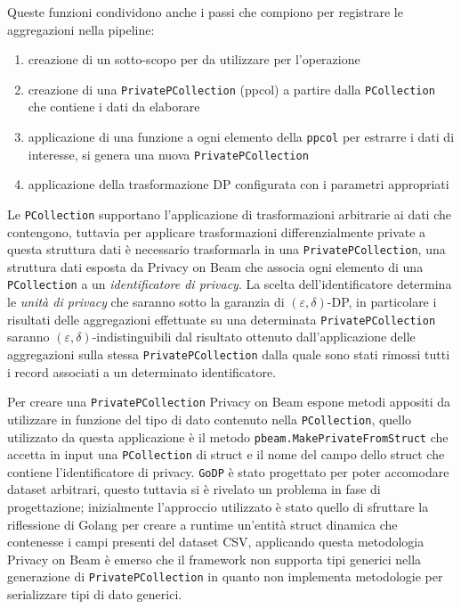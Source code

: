 Queste funzioni condividono anche i passi che compiono per registrare le aggregazioni nella pipeline:
\begin{enumerate}
    \item creazione di un sotto-scopo per da utilizzare per l'operazione
    \item creazione di una \texttt{PrivatePCollection} (ppcol) a partire dalla \texttt{PCollection} che contiene i dati da elaborare
    \item applicazione di una funzione a ogni elemento della \texttt{ppcol} per estrarre i dati di interesse, si genera una nuova \texttt{PrivatePCollection}
    \item applicazione della trasformazione DP configurata con i parametri appropriati
\end{enumerate}

Le \texttt{PCollection} supportano l'applicazione di trasformazioni arbitrarie ai dati che contengono, tuttavia per applicare trasformazioni differenzialmente private a questa struttura dati è necessario trasformarla in una \texttt{PrivatePCollection}, una struttura dati esposta da Privacy on Beam che associa ogni elemento di una \texttt{PCollection} a un \textit{identificatore di privacy}. La scelta dell'identificatore determina le \textit{unità di privacy} che saranno sotto la garanzia di $(\varepsilon, \delta)$-DP, in particolare i risultati delle aggregazioni effettuate su una determinata \texttt{PrivatePCollection} saranno $(\varepsilon, \delta)$-indistinguibili dal risultato ottenuto dall'applicazione delle aggregazioni sulla stessa \texttt{PrivatePCollection} dalla quale sono stati rimossi tutti i record associati a un determinato identificatore.

Per creare una \texttt{PrivatePCollection} Privacy on Beam espone metodi appositi da utilizzare in funzione del tipo di dato contenuto nella \texttt{PCollection}, quello utilizzato da questa applicazione è il metodo \texttt{pbeam.MakePrivateFromStruct} che accetta in input una \texttt{PCollection} di struct e il nome del campo dello struct che contiene l'identificatore di privacy. \texttt{GoDP} è stato progettato per poter accomodare dataset arbitrari, questo tuttavia si è rivelato un problema in fase di progettazione; inizialmente l'approccio utilizzato è stato quello di sfruttare la riflessione di Golang per creare a runtime un'entità struct dinamica che contenesse i campi presenti del dataset CSV, applicando questa metodologia Privacy on Beam è emerso che il framework non supporta tipi generici nella generazione di \texttt{PrivatePCollection} in quanto non implementa metodologie per serializzare tipi di dato generici.

